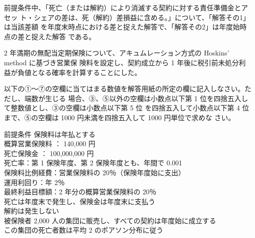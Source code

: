 \documentclass[report,gutter=10mm,fore-edge=10mm,uplatex,dvipdfmx]{jlreq}
\begin{document}
前提条件中、「死亡（または解約）により消滅する契約に対する責任準備金とアセッ
ト・シェアの差は、死（解約）差損益に含める。」について、「解答その1」は当該差額
を年度末時点における差と捉えた解答で、「解答その2」は年度始時点の差と捉えた解答
である。

2 年満期の無配当定期保険について、アキュムレーション方式の Hoskins’ method に基づき営業保
険料を設定し、契約成立から 1 年後に税引前未処分利益が負値となる確率を計算することにした。

以下の①～⑦の空欄に当てはまる数値を解答用紙の所定の欄に記入しなさい。ただし、端数が生じる
場合、③、⑤以外の空欄は小数点以下第 1 位を四捨五入して整数値とし、③の空欄は小数点以下第 5 位
を四捨五入して小数点以下第 4 位まで、⑤の空欄は 1000 円未満を四捨五入して 1000 円単位で求めな
さい。

\begin{itembox}[l]{前提条件}
保険料は年払とする\\
概算営業保険料 ： 140,000 円\\
死亡保険金 ： 100,000,000 円\\
死亡率：第 1 保険年度、第 2 保険年度とも、年間で 0.001\\
保険料比例経費：営業保険料の 20％（保険年度始に支出）\\
運用利回り：年 2％\\
最終利益目標額：2 年分の概算営業保険料の 20％\\
死亡は年度末で発生し、保険金は年度末に支払う\\
解約は発生しない\\
被保険者 2,000 人の集団に販売し、すべての契約は年度始に成立する\\
この集団の死亡者数は平均 2 のポアソン分布に従う\\
\end{itembox}
 
\end{document}
